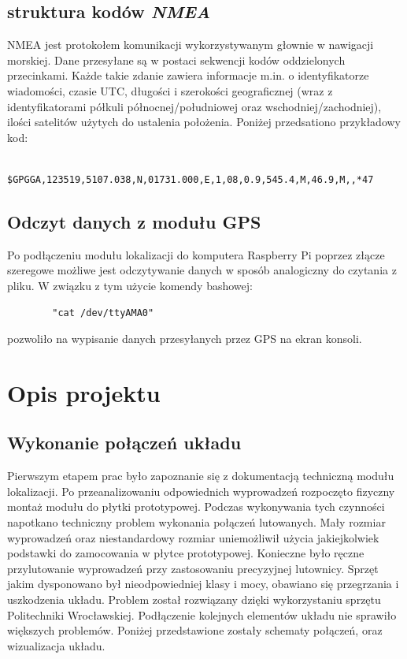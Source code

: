 \documentclass{article}
\begin{document}
	\subsection{struktura kodów \textit{NMEA}}
		NMEA jest protokołem komunikacji wykorzystywanym głownie w nawigacji morskiej. Dane przesyłane są w postaci sekwencji kodów oddzielonych przecinkami. Każde takie zdanie zawiera informacje m.in. o identyfikatorze wiadomości, czasie UTC, długości i szerokości geograficznej (wraz z identyfikatorami półkuli północnej/południowej oraz wschodniej/zachodniej),  ilości satelitów użytych do ustalenia położenia. Poniżej przedsationo przykładowy kod:
		\begin{verbatim}
		$GPGGA,123519,5107.038,N,01731.000,E,1,08,0.9,545.4,M,46.9,M,,*47
		\end{verbatim}
    \subsection{Odczyt danych z modułu GPS }
    
	   Po podłączeniu modułu lokalizacji do komputera Raspberry Pi poprzez złącze szeregowe możliwe jest odczytywanie danych w sposób analogiczny do czytania z pliku. W związku z tym użycie komendy bashowej:
	   	\begin{verbatim}
	   	"cat /dev/ttyAMA0"
	   	\end{verbatim} 
	   	pozwoliło na wypisanie danych przesyłanych przez GPS na ekran konsoli.
\section{Opis projektu}
	\subsection{Wykonanie połączeń układu}
		Pierwszym etapem prac było zapoznanie się z dokumentacją techniczną modułu lokalizacji. Po przeanalizowaniu odpowiednich wyprowadzeń rozpoczęto fizyczny montaż modułu do płytki prototypowej. Podczas wykonywania tych czynności napotkano techniczny problem wykonania połączeń lutowanych. Mały rozmiar wyprowadzeń oraz niestandardowy rozmiar uniemożliwił użycia jakiejkolwiek podstawki do zamocowania w płytce prototypowej. Konieczne było ręczne przylutowanie wyprowadzeń przy zastosowaniu precyzyjnej lutownicy. Sprzęt jakim dysponowano był nieodpowiedniej klasy i mocy, obawiano się przegrzania i uszkodzenia układu. Problem został rozwiązany dzięki wykorzystaniu sprzętu Politechniki Wrocławskiej. Podłączenie kolejnych elementów układu nie sprawiło większych problemów. Poniżej przedstawione zostały schematy połączeń, oraz wizualizacja układu.
		
\end{document}
